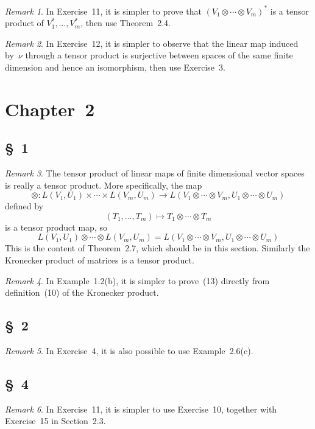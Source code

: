 \documentclass[letterpaper,12pt]{article}
\newcommand{\tprod}{\otimes}
\newcommand{\dual}[1]{#1^*}
\newcommand{\multi}[4]{#2_{#3}#1\cdots#1#2_{#4}}
\newcommand{\tprods}[3]{\multi{\tprod}{#1}{#2}{#3}}
\theoremstyle{definition}
\theoremstyle{remark}
\newtheorem*{rmk}{Remark}
\begin{document}
\begin{rmk}
In Exercise~11, it is simpler to prove that \(\dual{(\tprods{V}{1}{m})}\) is a tensor product of \(\dual{V_1},\ldots,\dual{V_m}\), then use Theorem~2.4.
\end{rmk}

\begin{rmk}
In Exercise~12, it is simpler to observe that the linear map induced by~\(\nu\) through a tensor product is surjective between spaces of the same finite dimension and hence an isomorphism, then use Exercise~3.
\end{rmk}

\newpage
\section*{Chapter~2}
\subsection*{\S~1}
\begin{rmk}
The tensor product of linear maps of finite dimensional vector spaces is really a tensor product. More specifically, the map
\[\tprod:L(V_1,U_1)\times\cdots\times L(V_m,U_m)\to L(\tprods{V}{1}{m},\tprods{U}{1}{m})\]
defined by
\[(T_1,\ldots,T_m)\mapsto\tprods{T}{1}{m}\]
is a tensor product map, so
\[L(V_1,U_1)\tprod\cdots\tprod L(V_m,U_m)=L(\tprods{V}{1}{m},\tprods{U}{1}{m})\]
This is the content of Theorem~2.7, which should be in this section. Similarly the Kronecker product of matrices is a tensor product.
\end{rmk}

\begin{rmk}
In Example~1.2(b), it is simpler to prove~(13) directly from definition~(10) of the Kronecker product.
\end{rmk}

\subsection*{\S~2}
\begin{rmk}
In Exercise~4, it is also possible to use Example~2.6(c).
\end{rmk}

\subsection*{\S~4}
\begin{rmk}
In Exercise~11, it is simpler to use Exercise~10, together with Exercise~15 in Section~2.3.
\end{rmk}
\end{document}
